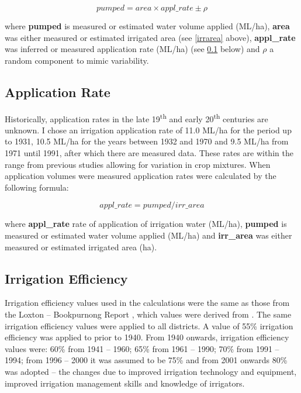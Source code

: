 \documentclass[a4paper, titlepage, 12pt]{article}\usepackage[]{graphicx}\usepackage[]{color}
\begin{document}
\begin{sffamily}
\begin{equation}  \label{eqn01}
  pumped  = area \times appl\_rate \pm \rho
\end{equation} 
 
\noindent where \textbf{pumped} is measured or estimated water volume applied (ML/ha), \textbf{area} was either measured or estimated irrigated area (see \ref{irrarea} above), \textbf{appl\_rate} was inferred or measured application rate (ML/ha) (see \ref{apprate} below) and \textbf{$\rho$} a random component to mimic variability.

\subsection{Application Rate} \label{apprate} Historically, application rates in the late 19\textsuperscript{th} and early 20\textsuperscript{th} centuries are unknown. I chose an irrigation application rate of 11.0 ML/ha for the period up to 1931, 10.5 ML/ha for the years between 1932 and 1970 and 9.5 ML/ha from 1971 until 1991, after which there are measured data. These rates are within the range from previous studies \citep{Meissner2014, Meissner2012, Meissner2011a, Meissner2011b} allowing for variation in crop mixtures. When application volumes were measured application rates were calculated by the following formula:

\begin{equation}  \label{eqn02}
 appl\_rate = pumped / irr\_area 
\end{equation}

\noindent where \textbf{appl\_rate} rate of application of irrigation water (ML/ha), \textbf{pumped} is measured or estimated water volume applied (ML/ha) and \textbf{irr\_area} was either measured or estimated irrigated area (ha).

\subsection{Irrigation Efficiency} \label{irreff} Irrigation efficiency values used in the calculations were the same as those from the Loxton -- Bookpurnong Report \citep{Meissner2011a}, which values were derived from \citet{Adams2009}. The same irrigation efficiency values were applied to all districts.  A value of 55\% irrigation efficiency was applied to prior to 1940. From 1940 onwards, irrigation efficiency values were: 60\% from 1941 -- 1960; 65\% from 1961 -- 1990; 70\% from 1991 -- 1994; from 1996 -- 2000 it was assumed to be 75\% and from 2001 onwards 80\% was adopted -- the changes due to improved irrigation technology and equipment, improved irrigation management skills and knowledge of irrigators.


\end{sffamily}
\end{document}
